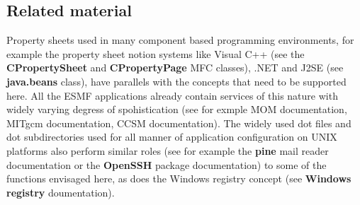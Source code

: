 \subsection{Related material}
 Property sheets used in many component based programming environments, for example
the property sheet notion  systems like Visual C++ (see the {\bf CPropertySheet} and
{\bf CPropertyPage} MFC classes), .NET and J2SE (see {\bf java.beans} class), have parallels with the concepts that need to 
be supported here. All the ESMF applications already contain services of this nature with widely 
varying degress of spohistication (see for exmple MOM documentation, MITgcm documentation, CCSM documentation). The 
widely used dot files and dot subdirectories used for all manner of application configuration on UNIX 
platforms also perform similar roles (see for example the {\bf pine} mail reader
documentation or the {\bf OpenSSH} package documentation) to some of the functions envisaged here, as does the Windows 
registry concept (see {\bf Windows registry} doumentation).


